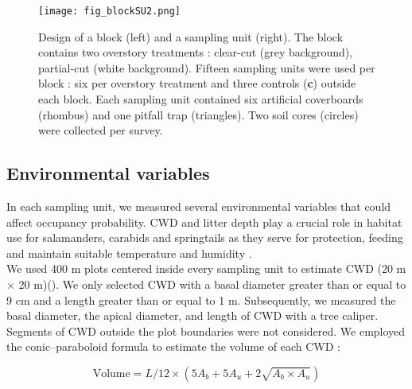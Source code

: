 \begin{figure}[ht]
	\centering
	\texttt{[image: fig\_blockSU2.png]}
	\caption[Design of one block and one sampling unit with three sampling methods.]{
  Design of a block (left) and a sampling unit (right). 
  The block contains two overstory treatments : clear-cut (grey background), partial-cut (white background). 
  Fifteen sampling units were used per block : six per overstory treatment and three controls (\textbf{c}) outside each block.
  Each sampling unit contained six artificial coverboards (rhombus) and one pitfall trap (triangles). Two soil cores (circles) were collected per survey.
  }
	\label{fig:blockSU}
	\end{figure}  

  \vspace{0.5cm}


\subsection*{Environmental variables}
\label{subsec:EnvVar}

In each sampling unit, we measured several environmental variables that could affect occupancy probability.
CWD and litter depth play a crucial role in habitat use for salamanders, carabids and springtails as
they serve for protection, feeding and maintain suitable temperature and humidity \citep{birdChangesSoilLitter2004,groverInfluenceCoverMoisture1998a,harmonEcologyCoarseWoody1986,koivula.LeafLitterSmallscale1999,mckennyEffectsStructuralComplexity2006,patrickEffectsExperimentalForestry2006a}. \\
We used 400 m plots centered inside every sampling unit to estimate CWD (20 m $\times$  20 m)(\citealp{methotGuideInventaireEchantillonnage2014}). 
We only selected CWD with a basal diameter greater than or equal to 9 cm and a length greater than or equal to 1 m.
Subsequently, we measured the basal diameter, the apical diameter, and length of CWD with a tree caliper.
Segments of CWD outside the plot boundaries were not considered.
We employed the conic–paraboloid formula to estimate the volume of each CWD \citep{fraverRefiningVolumeEstimates2007} :

\begin{equation}
  \text{Volume} = L/12 \times (5A_b + 5A_u + 2\sqrt{A_b \times A_u})
\end{equation}

\vspace{0.5cm}

